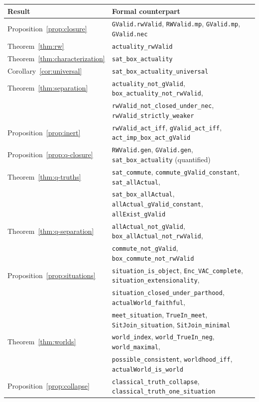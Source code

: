 \documentclass[11pt]{amsart}
\theoremstyle{plain}
\theoremstyle{definition}
\theoremstyle{remark}
\begin{document}
\begin{table}[ht]
\centering
\small
\begin{tabular}{@{}ll@{}}
\toprule
Result & Formal counterpart \\
\midrule
Proposition~\ref{prop:closure} & \texttt{GValid.rwValid}, \texttt{RWValid.mp}, \texttt{GValid.mp}, \texttt{GValid.nec} \\
Theorem~\ref{thm:rw} & \texttt{actuality\_rwValid} \\
Theorem~\ref{thm:characterization} & \texttt{sat\_box\_actuality} \\
Corollary~\ref{cor:universal} & \texttt{sat\_box\_actuality\_universal} \\
Theorem~\ref{thm:separation} & \texttt{actuality\_not\_gValid}, \texttt{box\_actuality\_not\_rwValid}, \\
 & \texttt{rwValid\_not\_closed\_under\_nec}, \texttt{rwValid\_strictly\_weaker} \\
Proposition~\ref{prop:inert} & \texttt{rwValid\_act\_iff}, \texttt{gValid\_act\_iff}, \texttt{act\_imp\_box\_act\_gValid} \\
Proposition~\ref{prop:q-closure} & \texttt{RWValid.gen}, \texttt{GValid.gen}, \texttt{sat\_box\_actuality} (quantified) \\
Theorem~\ref{thm:q-truths} & \texttt{sat\_commute}, \texttt{commute\_gValid\_constant}, \texttt{sat\_allActual}, \\
 & \texttt{sat\_box\_allActual}, \texttt{allActual\_gValid\_constant}, \texttt{allExist\_gValid} \\
Theorem~\ref{thm:q-separation} & \texttt{allActual\_not\_gValid}, \texttt{box\_allActual\_not\_rwValid}, \\
 & \texttt{commute\_not\_gValid}, \texttt{box\_commute\_not\_rwValid} \\
Proposition~\ref{prop:situations} & \texttt{situation\_is\_object}, \texttt{Enc\_VAC\_complete}, \texttt{situation\_extensionality}, \\
 & \texttt{situation\_closed\_under\_parthood}, \texttt{actualWorld\_faithful}, \\
 & \texttt{meet\_situation}, \texttt{TrueIn\_meet}, \texttt{SitJoin\_situation}, \texttt{SitJoin\_minimal} \\
Theorem~\ref{thm:worlds} & \texttt{world\_index}, \texttt{world\_TrueIn\_neg}, \texttt{world\_maximal}, \\
 & \texttt{possible\_consistent}, \texttt{worldhood\_iff}, \texttt{actualWorld\_is\_world} \\
Proposition~\ref{prop:collapse} & \texttt{classical\_truth\_collapse}, \texttt{classical\_truth\_one\_situation} \\

\end{tabular}
\end{table}
\end{document}
